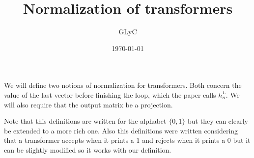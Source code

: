 \documentclass{article}
\title{Normalization of transformers}
\author{GLyC}
\date{\today}
\begin{document}
\maketitle

We will define two notions of normalization for transformers. Both concern the value of the last vector before finishing the loop, which the paper calls $h_n^L$. We will also require that the output matrix be a projection.

Note that this definitions are written for the alphabet $\{0,1\}$ but they can clearly be extended to a more rich one. Also this definitions were written considering that a transformer accepts when it prints a $1$ and rejects when it prints a $0$ but it can be slightly modified so it works with our definition.




\end{document}
